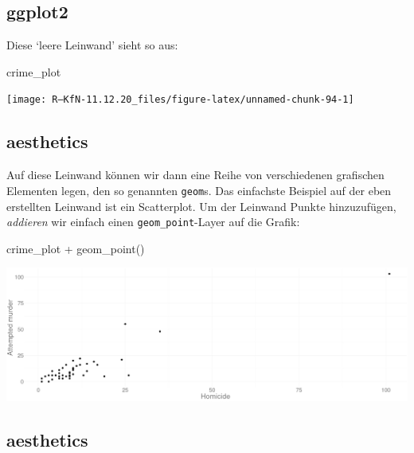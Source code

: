 \documentclass[
]{book}
\newenvironment{Shaded}{\begin{snugshade}}{\end{snugshade}}
\newcommand{\FunctionTok}[1]{\textcolor[rgb]{0.00,0.00,0.00}{#1}}
\newcommand{\NormalTok}[1]{#1}
\newcommand{\SpecialCharTok}[1]{\textcolor[rgb]{0.00,0.00,0.00}{#1}}
\begin{document}
\hypertarget{ggplot2-2}{%
\subsection{ggplot2}\label{ggplot2-2}}

Diese `leere Leinwand' sieht so aus:

\begin{Shaded}
\begin{Highlighting}[]
\NormalTok{crime\_plot}
\end{Highlighting}
\end{Shaded}

\begin{center}\texttt{[image: R---KfN-11.12.20\_files/figure-latex/unnamed-chunk-94-1]} \end{center}

\hypertarget{aesthetics}{%
\subsection{aesthetics}\label{aesthetics}}

Auf diese Leinwand können wir dann eine Reihe von verschiedenen grafischen Elementen legen, den so genannten \texttt{geom}s. Das einfachste Beispiel auf der eben erstellten Leinwand ist ein Scatterplot.
Um der Leinwand Punkte hinzuzufügen, \emph{addieren} wir einfach einen \texttt{geom\_point}-Layer auf die Grafik:

\begin{Shaded}
\begin{Highlighting}[]
\NormalTok{crime\_plot }\SpecialCharTok{+} \FunctionTok{geom\_point}\NormalTok{()}
\end{Highlighting}
\end{Shaded}

\begin{center}\includegraphics[width=24in]{imgs/pts} \end{center}

\hypertarget{aesthetics-1}{%
\subsection{aesthetics}\label{aesthetics-1}}
\end{document}
